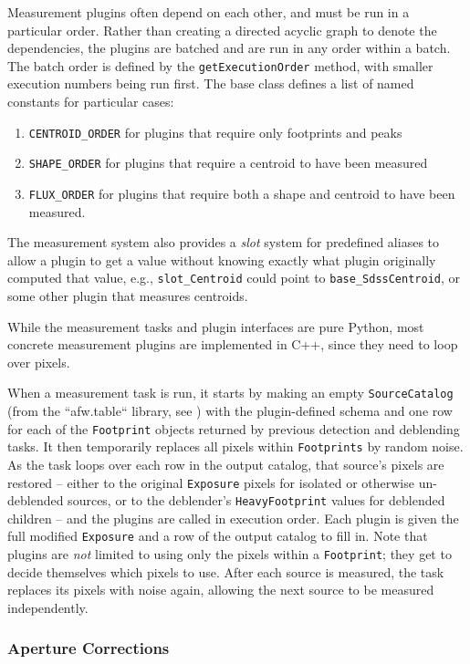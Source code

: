 Measurement plugins often depend on each other, and must be run in a particular order.
Rather than creating a directed acyclic graph to denote the dependencies, the plugins are batched and are run in any order within a batch.
The batch order is defined by the \texttt{getExecutionOrder} method, with smaller execution numbers being run first.
The base class defines a list of named constants for particular cases:
\begin{enumerate}
    \item \texttt{CENTROID\_ORDER} for plugins that require only footprints and peaks
    \item \texttt{SHAPE\_ORDER} for plugins that require a centroid to have been measured
    \item \texttt{FLUX\_ORDER} for plugins that require both a shape and centroid to have been measured.
\end{enumerate}
The measurement system also provides a \textit{slot} system for predefined aliases to allow a plugin to get a value without knowing exactly what plugin originally computed that value, e.g., \texttt{slot\_Centroid} could point to \texttt{base\_SdssCentroid}, or some other plugin that measures centroids.

While the measurement tasks and plugin interfaces are pure Python, most concrete measurement plugins are implemented in C++, since they need to loop over pixels.

When a measurement task is run, it starts by making an empty
\texttt{SourceCatalog} (from the ``afw.table`` library, see ) with the plugin-defined schema and one row for each of the \texttt{Footprint} objects returned by previous detection and deblending tasks.
It then temporarily replaces all pixels within \texttt{Footprints} by random noise.
As the task loops over each row in the output catalog, that source's pixels are restored -- either to the original \texttt{Exposure} pixels for isolated or otherwise un-deblended sources, or to the deblender's \texttt{HeavyFootprint} values for deblended children -- and the plugins are called in execution order.
Each plugin is given the full modified \texttt{Exposure} and a row of the output catalog to fill in.
Note that plugins are \emph{not} limited to using only the pixels within a \texttt{Footprint}; they get to decide themselves which pixels to use.
After each source is measured, the task replaces its pixels with noise again, allowing the next source to be measured independently.

\subsubsection{Aperture Corrections}
\label{sec:apcorr}

